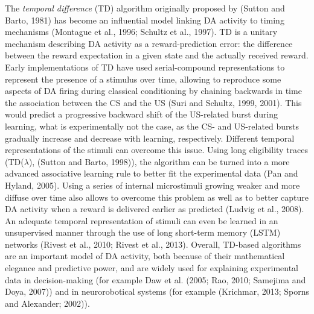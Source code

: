 \documentclass[
  11pt,
  a4paper,
]{scrbook}
\begin{document}
The \emph{temporal difference} (TD) algorithm originally proposed by
(Sutton and Barto, 1981) has become an influential model linking DA
activity to timing mechanisms (Montague et al., 1996; Schultz et al.,
1997). TD is a unitary mechanism describing DA activity as a
reward-prediction error: the difference between the reward expectation
in a given state and the actually received reward. Early implementations
of TD have used serial-compound representations to represent the
presence of a stimulus over time, allowing to reproduce some aspects of
DA firing during classical conditioning by chaining backwards in time
the association between the CS and the US (Suri and Schultz, 1999,
2001). This would predict a progressive backward shift of the US-related
burst during learning, what is experimentally not the case, as the CS-
and US-related bursts gradually increase and decrease with learning,
respectively. Different temporal representations of the stimuli can
overcome this issue. Using long eligibility traces (TD(\(\lambda\)),
(Sutton and Barto, 1998)), the algorithm can be turned into a more
advanced associative learning rule to better fit the experimental data
(Pan and Hyland, 2005). Using a series of internal microstimuli growing
weaker and more diffuse over time also allows to overcome this problem
as well as to better capture DA activity when a reward is delivered
earlier as predicted (Ludvig et al., 2008). An adequate temporal
representation of stimuli can even be learned in an unsupervised manner
through the use of long short-term memory (LSTM) networks (Rivest et
al., 2010; Rivest et al., 2013). Overall, TD-based algorithms are an
important model of DA activity, both because of their mathematical
elegance and predictive power, and are widely used for explaining
experimental data in decision-making (for example Daw et al. (2005; Rao,
2010; Samejima and Doya, 2007)) and in neurorobotical systems (for
example (Krichmar, 2013; Sporns and Alexander; 2002)).
\end{document}
